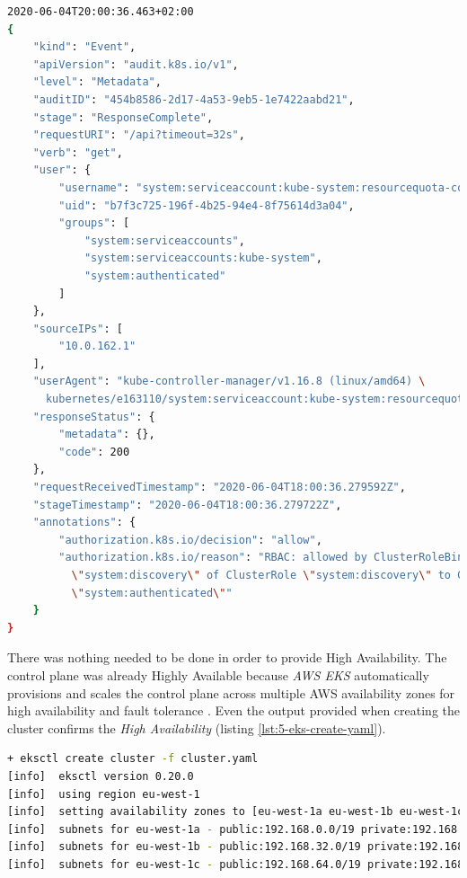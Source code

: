 \begin{lstlisting}[basicstyle=\scriptsize,xleftmargin=0cm,label=lst:5-eks-log-msg,caption={Example log message},captionpos=b,language=Bash,showstringspaces=false ]
2020-06-04T20:00:36.463+02:00
{
    "kind": "Event",
    "apiVersion": "audit.k8s.io/v1",
    "level": "Metadata",
    "auditID": "454b8586-2d17-4a53-9eb5-1e7422aabd21",
    "stage": "ResponseComplete",
    "requestURI": "/api?timeout=32s",
    "verb": "get",
    "user": {
        "username": "system:serviceaccount:kube-system:resourcequota-controller",
        "uid": "b7f3c725-196f-4b25-94e4-8f75614d3a04",
        "groups": [
            "system:serviceaccounts",
            "system:serviceaccounts:kube-system",
            "system:authenticated"
        ]
    },
    "sourceIPs": [
        "10.0.162.1"
    ],
    "userAgent": "kube-controller-manager/v1.16.8 (linux/amd64) \
      kubernetes/e163110/system:serviceaccount:kube-system:resourcequota-controller",
    "responseStatus": {
        "metadata": {},
        "code": 200
    },
    "requestReceivedTimestamp": "2020-06-04T18:00:36.279592Z",
    "stageTimestamp": "2020-06-04T18:00:36.279722Z",
    "annotations": {
        "authorization.k8s.io/decision": "allow",
        "authorization.k8s.io/reason": "RBAC: allowed by ClusterRoleBinding \
          \"system:discovery\" of ClusterRole \"system:discovery\" to Group \
          \"system:authenticated\""
    }
}
\end{lstlisting}

There was nothing needed to be done in order to provide High Availability. The control plane was already Highly Available because \textit{AWS EKS} automatically provisions and scales the control plane across multiple AWS availability zones for high availability and fault tolerance \cite{eks-faqs}. Even the output provided when creating the cluster confirms the \textit{High Availability} (listing \ref{lst:5-eks-create-yaml}).
\begin{lstlisting}[basicstyle=\scriptsize,xleftmargin=0cm,label=lst:5-eks-create-yaml,caption={Output from creating a \textit{eksctl} cluster},captionpos=b,language=Bash ]
+ eksctl create cluster -f cluster.yaml
[info]  eksctl version 0.20.0
[info]  using region eu-west-1
[info]  setting availability zones to [eu-west-1a eu-west-1b eu-west-1c]
[info]  subnets for eu-west-1a - public:192.168.0.0/19 private:192.168.96.0/19
[info]  subnets for eu-west-1b - public:192.168.32.0/19 private:192.168.128.0/19
[info]  subnets for eu-west-1c - public:192.168.64.0/19 private:192.168.160.0/19
\end{lstlisting}

